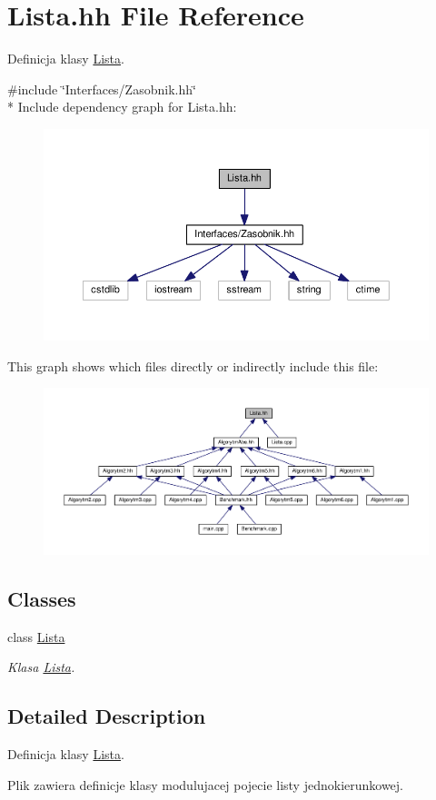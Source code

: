 \hypertarget{a00042}{}\section{Lista.\+hh File Reference}
\label{a00042}


Definicja klasy \hyperlink{a00012}{Lista}.  


{\ttfamily \#include \char`\"{}Interfaces/\+Zasobnik.\+hh\char`\"{}}\\*
Include dependency graph for Lista.\+hh\+:
\nopagebreak
\begin{figure}[H]
\begin{center}
\leavevmode
\includegraphics[width=350pt]{a00088}
\end{center}
\end{figure}
This graph shows which files directly or indirectly include this file\+:
\nopagebreak
\begin{figure}[H]
\begin{center}
\leavevmode
\includegraphics[width=350pt]{a00089}
\end{center}
\end{figure}
\subsection*{Classes}
\begin{DoxyCompactItemize}
\item 
class \hyperlink{a00012}{Lista}
\begin{DoxyCompactList}\small\item\em Klasa \hyperlink{a00012}{Lista}. \end{DoxyCompactList}\end{DoxyCompactItemize}


\subsection{Detailed Description}
Definicja klasy \hyperlink{a00012}{Lista}. 

Plik zawiera definicje klasy modulujacej pojecie listy jednokierunkowej. 